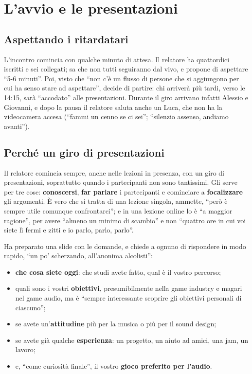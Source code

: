 \section{L'avvio e le presentazioni}
\label{z9:sec:avvio}

\subsection{Aspettando i ritardatari}

L'incontro comincia con qualche minuto di attesa. Il relatore ha quattordici
iscritti e sei collegati; sa che non tutti seguiranno dal vivo, e propone di
aspettare ``5-6 minuti''. Poi, visto che ``non c'è un flusso di persone che si
aggiungono per cui ha senso stare ad aspettare'', decide di partire: chi arriverà
più tardi, verso le 14:15, sarà ``accodato'' alle presentazioni. Durante il giro
arrivano infatti Alessio e Giovanni, e dopo la pausa il relatore saluta anche un
Luca, che non ha la videocamera accesa (``fammi un cenno se ci sei''; ``silenzio
assenso, andiamo avanti'').

\subsection{Perché un giro di presentazioni}

Il relatore comincia sempre, anche nelle lezioni in presenza, con un giro di
presentazioni, soprattutto quando i partecipanti non sono tantissimi. Gli serve
per tre cose: \textbf{conoscersi}, \textbf{far parlare} i partecipanti e
cominciare a \textbf{focalizzare} gli argomenti. È vero che si tratta di una
lezione singola, ammette, ``però è sempre utile comunque confrontarci''; e in una
lezione online lo è ``a maggior ragione'', per avere ``almeno un minimo di
scambio'' e non ``quattro ore in cui voi siete lì fermi e zitti e io parlo,
parlo, parlo''.

Ha preparato una slide con le domande, e chiede a ognuno di rispondere in modo
rapido, ``un po' scherzando, all'anonima alcolisti'':
\begin{itemize}
  \item \textbf{che cosa siete oggi}: che studi avete fatto, qual è il vostro
        percorso;
  \item quali sono i vostri \textbf{obiettivi}, presumibilmente nella game
        industry e magari nel game audio, ma è ``sempre interessante scoprire
        gli obiettivi personali di ciascuno'';
  \item se avete un'\textbf{attitudine} più per la musica o più per il sound
        design;
  \item se avete già qualche \textbf{esperienza}: un progetto, un aiuto ad
        amici, una jam, un lavoro;
  \item e, ``come curiosità finale'', il vostro \textbf{gioco preferito per
        l'audio}.
\end{itemize}

